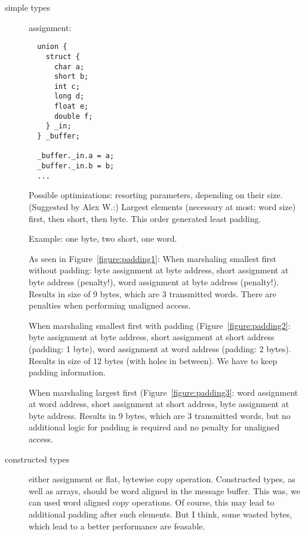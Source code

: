 \begin{description}
\item[simple types] assignment:

  \begin{verbatim}
  union {
    struct {
      char a;
      short b;
      int c;
      long d;
      float e;
      double f;
    } _in;
  } _buffer;

  _buffer._in.a = a;
  _buffer._in.b = b;
  ...
  \end{verbatim}

  Possible optimizations: resorting parameters, depending on their
  size. (Suggested by Alex W.:) Largest elements (necessary at most:
  word size) first, then short, then byte.  This order generated least
  padding.  
  
  Example: one byte, two short, one word.  

  
  As seen in Figure~\ref{figure:padding1}: When marshaling smallest 
  first without padding: byte assignment at byte address, short assignment
  at byte address (penalty!), word assignment at byte address (penalty!).
  Results in size of 9 bytes, which are 3 transmitted words. There are
  penalties when performing unaligned access.
  
  
  When marshaling smallest first with padding (Figure~\ref{figure:padding2}: 
  byte assignment at byte address, short assignment at short address 
  (padding: 1 byte), word assignment at word address (padding: 2 bytes).  
  Results in size of 12 bytes (with holes in between).  We have to keep
  padding information.
  

  When marshaling largest first (Figure~\ref{figure:padding3}: word 
  assignment at word address, short assignment at short address, byte 
  assignment at byte address. Results in 9 bytes, which are 3 transmitted 
  words, but no additional logic for padding is required and no penalty for
  unaligned access.

\item[constructed types] either assignment or flat, bytewise copy operation.
  Constructed types, as well as arrays, should be word aligned in the message
  buffer. This was, we can used word aligned copy operations.  Of course,
  this may lead to additional padding after such elements. But I think, some
  wasted bytes, which lead to a better performance are feasable.
  

\end{description}
